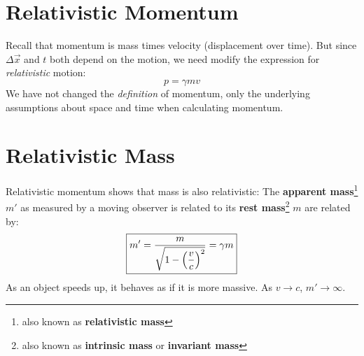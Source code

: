 \section{Relativistic Momentum}
Recall that momentum is mass times velocity (displacement over time). But
since $\Delta\vec x$ and $t$ both depend on the motion, we need modify
the expression for \emph{relativistic} motion:
\begin{equation} 
    \boxed{
      p
      =\gamma mv
    }
\end{equation}
We have not changed the \emph{definition} of momentum, only the underlying
assumptions about space and time when calculating momentum.




\section{Relativistic Mass}
Relativistic momentum shows that mass is also relativistic: The
\textbf{apparent mass}\footnote{also known as \textbf{relativistic mass}} $m'$
as measured by a moving observer is related to its
\textbf{rest mass}\footnote{also known as \textbf{intrinsic mass} or
\textbf{invariant mass}} $m$ are related by:
\begin{equation}
  \boxed{m'=\frac m{\sqrt{1-\left(\dfrac vc\right)^2}}=
    \gamma m}
\end{equation}
As an object speeds up, it behaves as if it is more massive. As
$v\rightarrow c$, $m'\rightarrow\infty$.




